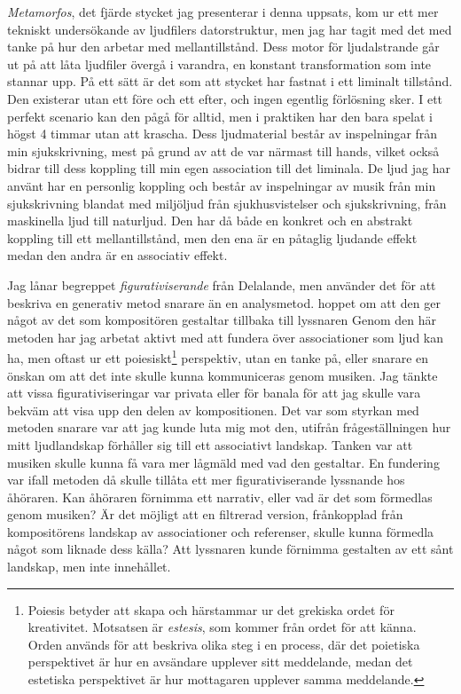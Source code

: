 \documentclass{article}
\begin{document}
\emph{Metamorfos}, det fjärde stycket jag presenterar i denna uppsats, kom ur ett mer tekniskt undersökande av
ljudfilers datorstruktur, men jag har tagit med det med tanke på hur den arbetar med mellantillstånd. Dess
motor för ljudalstrande går ut på att låta ljudfiler övergå i varandra, en konstant transformation som inte
stannar upp. På ett sätt är det som att stycket har fastnat i ett liminalt tillstånd. Den existerar utan ett
före och ett efter, och ingen egentlig förlösning sker. I ett perfekt scenario kan den pågå för alltid, men i
praktiken har den bara spelat i högst 4 timmar utan att krascha. Dess ljudmaterial består av inspelningar från
min sjukskrivning, mest på grund av att de var närmast till hands, vilket också bidrar till dess koppling till
min egen association till det liminala. De ljud jag har använt har en personlig koppling och består av
inspelningar av musik från min sjukskrivning blandat med miljöljud från sjukhusvistelser och sjukskrivning,
från maskinella ljud till naturljud. Den har då
både en konkret och en abstrakt koppling till ett mellantillstånd, men den ena är en påtaglig ljudande effekt
medan den andra är en associativ effekt.

Jag lånar begreppet \emph{figurativiserande} från Delalande, men använder det för att beskriva en generativ
metod snarare än en  analysmetod. %
hoppet om att den ger något av det som kompositören gestaltar tillbaka till lyssnaren Genom den här metoden
har jag arbetat aktivt med att fundera över associationer som ljud kan ha, men oftast ur ett
poiesiskt\footnote{Poiesis betyder att skapa och härstammar ur det grekiska ordet för kreativitet. Motsatsen
är \emph {estesis}, som kommer från ordet för att känna. Orden används för att beskriva olika steg i en
process, där det poietiska perspektivet är hur en avsändare upplever sitt meddelande, medan det estetiska
perspektivet är hur mottagaren upplever samma meddelande.} perspektiv, utan en tanke på, eller snarare en önskan om att
det inte skulle kunna kommuniceras genom musiken. Jag tänkte att vissa figurativiseringar var privata
eller för banala för att jag skulle vara bekväm att visa upp den delen av kompositionen. Det var som styrkan
med metoden snarare var att jag kunde luta mig mot den, utifrån frågeställningen hur mitt ljudlandskap
förhåller sig till ett associativt landskap. Tanken var att musiken skulle kunna få vara mer lågmäld med vad
den gestaltar. En fundering var ifall metoden då skulle tillåta ett mer figurativiserande lyssnande hos
åhöraren.
Kan åhöraren förnimma ett narrativ, eller vad är det som förmedlas genom musiken? Är det möjligt att en
filtrerad version, frånkopplad från kompositörens landskap av associationer och referenser, skulle kunna
förmedla något som liknade dess källa? Att lyssnaren kunde förnimma gestalten av ett sånt landskap, men inte
innehållet.
\end{document}
